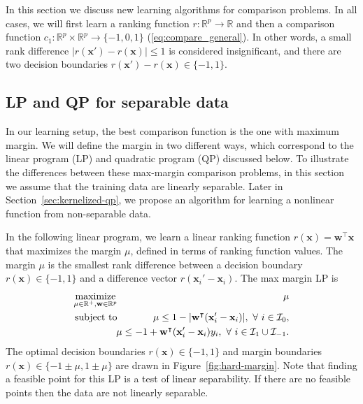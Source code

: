 \documentclass{article}
\newcommand{\RR}{\mathbb R}
\DeclareMathOperator*{\maximize}{maximize}
\begin{document}
In this section we discuss new learning algorithms for comparison
problems. In all cases, we will first learn a ranking function
$r:\RR^p\rightarrow\RR$ and then a comparison function
$c_1:\RR^p\times \RR^p\rightarrow\{-1,0,1\}$
(\ref{eq:compare_general}). In other words, a small rank difference
$|r(\mathbf x')-r(\mathbf x)|\leq 1$ is considered insignificant, and
there are two decision boundaries $r(\mathbf x')-r(\mathbf
x)\in\{-1,1\}$.

\subsection{LP and QP for separable data}
\label{sec:lp-qp}

In our learning setup, the best comparison function is the one with
maximum margin. We will define the margin in two different ways, which
correspond to the linear program (LP) and quadratic program (QP)
discussed below. To illustrate the differences between these
max-margin comparison problems, in this section we assume that the
training data are linearly separable. Later in
Section~\ref{sec:kernelized-qp}, we propose an algorithm for learning
a nonlinear function from non-separable data.

In the following linear program, we learn a linear ranking function
$r(\mathbf x)=\mathbf w^\intercal \mathbf x$ that maximizes the margin
$\mu$, defined in terms of ranking function values. The margin $\mu$
is the smallest rank difference between a decision boundary $r(\mathbf
x)\in\{-1,1\}$ and a difference vector $r(\mathbf x_i'-\mathbf
x_i)$. The max margin LP is
\begin{eqnarray}
  \label{eq:max-margin-lp}
  \maximize_{\mu\in\RR^+, \mathbf w\in\RR^p}\ &&\hskip -0.5cm \mu \\
  \nonumber
  \text{subject to}\ && \hskip -0.5cm \mu \leq
  1-|\mathbf w^\intercal (\mathbf x_i' - \mathbf x_i)|,\ 
  \forall\  i\in \mathcal I_0,\\
  \nonumber
  &&\hskip -0.5cm
  \mu \leq -1 +  \mathbf w^\intercal(\mathbf x_i'-\mathbf x_i)y_i,
  \ \forall\ i\in \mathcal I_1\cup \mathcal I_{-1}.
\end{eqnarray}
The optimal decision boundaries $r(\mathbf x)\in\{-1,1\}$ and margin
boundaries $r(\mathbf x)\in\{-1\pm \mu, 1 \pm \mu\}$ are drawn 
in Figure~\ref{fig:hard-margin}. Note that finding a feasible point
for this LP is a test of linear separability. If there are no feasible
points then the data are not linearly separable.
\end{document}
